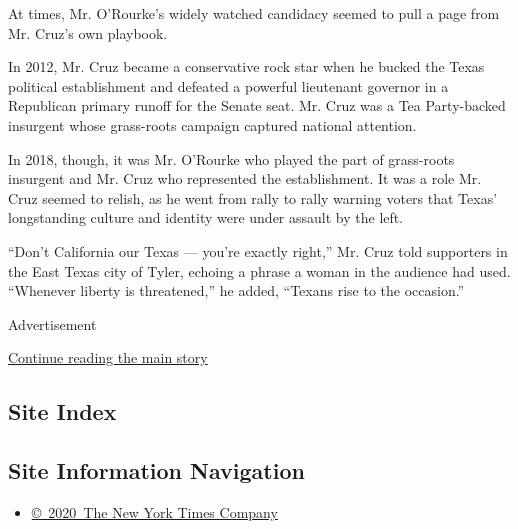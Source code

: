 At times, Mr. O'Rourke's widely watched candidacy seemed to pull a page
from Mr. Cruz's own playbook.

In 2012, Mr. Cruz became a conservative rock star when he bucked the
Texas political establishment and defeated a powerful lieutenant
governor in a Republican primary runoff for the Senate seat. Mr. Cruz
was a Tea Party-backed insurgent whose grass-roots campaign captured
national attention.

In 2018, though, it was Mr. O'Rourke who played the part of grass-roots
insurgent and Mr. Cruz who represented the establishment. It was a role
Mr. Cruz seemed to relish, as he went from rally to rally warning voters
that Texas' longstanding culture and identity were under assault by the
left.

``Don't California our Texas --- you're exactly right,'' Mr. Cruz told
supporters in the East Texas city of Tyler, echoing a phrase a woman in
the audience had used. ``Whenever liberty is threatened,'' he added,
``Texans rise to the occasion.''

Advertisement

\protect\hyperlink{after-bottom}{Continue reading the main story}

\hypertarget{site-index}{%
\subsection{Site Index}\label{site-index}}

\hypertarget{site-information-navigation}{%
\subsection{Site Information
Navigation}\label{site-information-navigation}}

\begin{itemize}
\tightlist
\item
  \href{https://help.nytimes.com/hc/en-us/articles/115014792127-Copyright-notice}{©~2020~The
  New York Times Company}
\end{itemize}


